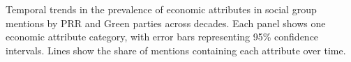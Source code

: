 Temporal trends in the prevalence of economic attributes in social group mentions by PRR and Green parties across decades. Each panel shows one economic attribute category, with error bars representing 95\% confidence intervals. Lines show the share of mentions containing each attribute over time.